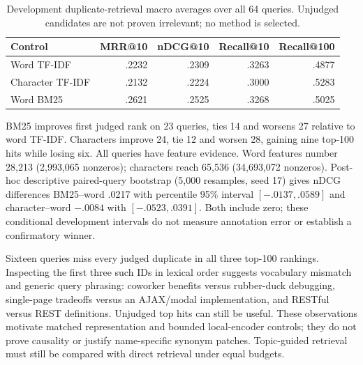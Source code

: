 \documentclass[11pt]{article}
\begin{document}
\begin{table}[ht]
\centering\small
\begin{tabular}{lrrrr}
\toprule
Control & MRR@10 & nDCG@10 & Recall@10 & Recall@100 \\
\midrule
Word TF-IDF & .2232 & .2309 & .3263 & .4877 \\
Character TF-IDF & .2132 & .2224 & .3000 & .5283 \\
Word BM25 & .2621 & .2525 & .3268 & .5025 \\
\bottomrule
\end{tabular}
\caption{Development duplicate-retrieval macro averages over all 64 queries.
Unjudged candidates are not proven irrelevant; no method is selected.}
\end{table}

BM25 improves first judged rank on 23 queries, ties 14 and worsens 27 relative
to word TF-IDF. Characters improve 24, tie 12 and worsen 28, gaining nine
top-100 hits while losing six. All queries have feature evidence. Word features
number 28,213 (2,993,065 nonzeros); characters reach 65,536 (34,693,072 nonzeros).
Post-hoc descriptive paired-query bootstrap (5,000 resamples, seed 17) gives
nDCG differences BM25--word .0217 with percentile 95\% interval
$[-.0137,.0589]$ and character--word $-.0084$ with $[-.0523,.0391]$.
Both include zero; these conditional development intervals do not measure
annotation error or establish a confirmatory winner.

Sixteen queries miss every judged duplicate in all three top-100 rankings.
Inspecting the first three such IDs in lexical order suggests vocabulary mismatch
and generic query phrasing: coworker benefits versus rubber-duck debugging,
single-page tradeoffs versus an AJAX/modal implementation, and RESTful versus
REST definitions. Unjudged top hits can still be useful. These observations
motivate matched representation and bounded local-encoder controls; they do not
prove causality or justify name-specific synonym patches. Topic-guided retrieval
must still be compared with direct retrieval under equal budgets.
\end{document}
